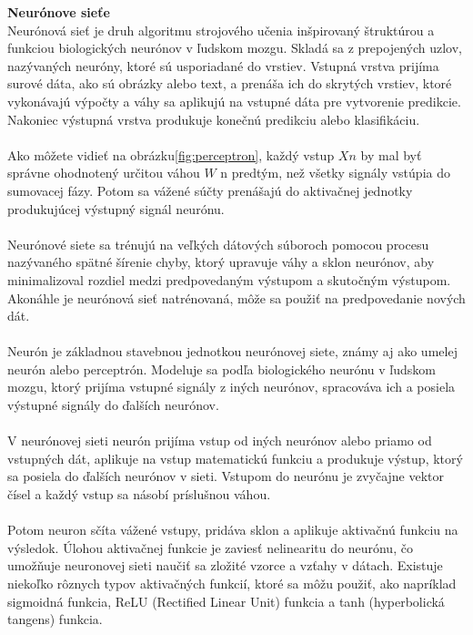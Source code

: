     \textbf{Neurónove sieťe} \\
    Neurónová sieť je druh algoritmu strojového učenia inšpirovaný štruktúrou a funkciou biologických neurónov v ľudskom mozgu.
    Skladá sa z prepojených uzlov, nazývaných neuróny, ktoré sú usporiadané do vrstiev. Vstupná vrstva prijíma surové dáta, ako sú obrázky alebo
    text, a prenáša ich do skrytých vrstiev, ktoré vykonávajú výpočty a váhy sa aplikujú na vstupné dáta pre vytvorenie predikcie.
    Nakoniec výstupná vrstva produkuje konečnú predikciu alebo klasifikáciu.\\
    \\
    Ako môžete vidieť na obrázku\ref{fig:perceptron}, každý vstup $Xn$ by mal byť správne ohodnotený určitou váhou $W$ n predtým,
    než všetky signály vstúpia do sumovacej fázy. Potom sa vážené súčty prenášajú do aktivačnej jednotky produkujúcej výstupný signál neurónu.\\
    \\
    Neurónové siete sa trénujú na veľkých dátových súboroch pomocou procesu nazývaného spätné šírenie chyby, ktorý upravuje váhy a sklon neurónov,
    aby minimalizoval rozdiel medzi predpovedaným výstupom a skutočným výstupom. Akonáhle je neurónová sieť natrénovaná, môže sa použiť na predpovedanie
    nových dát.\\
    \\
    Neurón je základnou stavebnou jednotkou neurónovej siete, známy aj ako umelej neurón alebo perceptrón. Modeluje sa podľa biologického
    neurónu v ľudskom mozgu, ktorý prijíma vstupné signály z iných neurónov, spracováva ich a posiela výstupné signály do ďalších neurónov.\\
    \\
    V neurónovej sieti neurón prijíma vstup od iných neurónov alebo priamo od vstupných dát, aplikuje na vstup matematickú funkciu a produkuje
    výstup, ktorý sa posiela do ďalších neurónov v sieti. Vstupom do neurónu je zvyčajne vektor čísel a každý vstup sa násobí príslušnou váhou.\\
    \\
    Potom neuron sčíta vážené vstupy, pridáva sklon a aplikuje aktivačnú funkciu na výsledok. Úlohou aktivačnej funkcie je zaviesť nelinearitu do
    neurónu, čo umožňuje neuronovej sieti naučiť sa zložité vzorce a vzťahy v dátach. Existuje niekoľko rôznych typov aktivačných funkcií, ktoré
    sa môžu použiť, ako napríklad sigmoidná funkcia, ReLU (Rectified Linear Unit) funkcia a tanh (hyperbolická tangens) funkcia.\\
